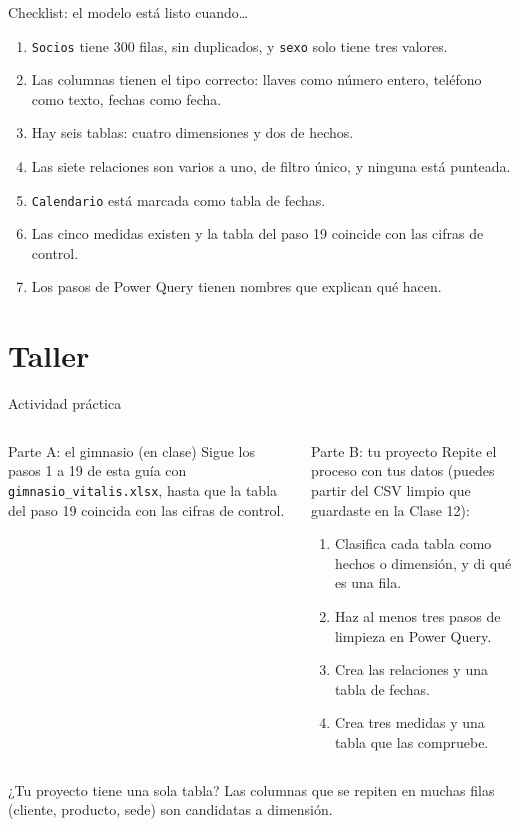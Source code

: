 \documentclass[aspectratio=169,11pt]{beamer}
\begin{document}
\begin{frame}[t]{Checklist: el modelo está listo cuando\ldots}
  \small
  \begin{enumerate}
    \item \texttt{Socios} tiene 300 filas, sin duplicados, y \texttt{sexo}
      solo tiene tres valores.
    \item Las columnas tienen el tipo correcto: llaves como número entero,
      teléfono como texto, fechas como fecha.
    \item Hay seis tablas: cuatro dimensiones y dos de hechos.
    \item Las siete relaciones son varios a uno, de filtro único, y
      ninguna está punteada.
    \item \texttt{Calendario} está marcada como tabla de fechas.
    \item Las cinco medidas existen y la tabla del paso 19 coincide con
      las cifras de control.
    \item Los pasos de Power Query tienen nombres que explican qué hacen.
  \end{enumerate}
\end{frame}

\section{Taller}
\begin{frame}[t]{Actividad práctica}
  \begin{columns}[T,onlytextwidth]
    \begin{block}{Parte A: el gimnasio (en clase)}
      \small Sigue los pasos 1 a 19 de esta guía con
      \texttt{gimnasio\_vitalis.xlsx}, hasta que la tabla del paso 19
      coincida con las cifras de control.
    \end{block}
    \begin{alertblock}{Parte B: tu proyecto}
      \small Repite el proceso con tus datos (puedes partir del CSV limpio
      que guardaste en la Clase 12):
      \begin{enumerate}
        \footnotesize
        \item Clasifica cada tabla como hechos o dimensión, y di qué es
          una fila.
        \item Haz al menos tres pasos de limpieza en Power Query.
        \item Crea las relaciones y una tabla de fechas.
        \item Crea tres medidas y una tabla que las compruebe.
      \end{enumerate}
    \end{alertblock}
  \end{columns}
  \vspace{0.05cm}
  \footnotesize ¿Tu proyecto tiene una sola tabla? Las columnas que se
  repiten en muchas filas (cliente, producto, sede) son candidatas a
  dimensión.
\end{frame}
\end{document}
